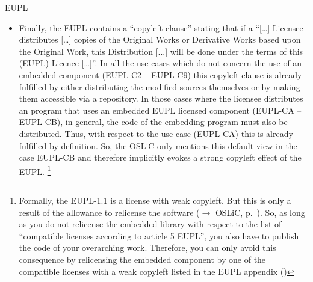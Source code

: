 \begin{license}{EUPL}
\begin{itemize}
\item Finally, the EUPL contains a \enquote{copyleft clause} stating that if a
  \enquote{[\ldots] Licensee distributes [\ldots] copies of the Original Works
  or Derivative Works based upon the Original Work, this Distribution [...] will
  be done under the terms of this (EUPL) Licence [\ldots]}. In all the use cases
  which do not concern the use of an embedded component (EUPL-C2 -- EUPL-C9) this
  copyleft clause is already fulfilled by either distributing the modified
  sources themselves or by making them accessible via a repository. In those
  cases where the licensee distributes an program that uses an embedded EUPL
  licensed component (EUPL-CA -- EUPL-CB), in general, the code of the embedding
  program must also be distributed. Thus, with respect to the use case (EUPL-CA)
  this is already fulfilled by definition. So, the OSLiC only mentions this
  default view in the case EUPL-CB and therefore implicitly evokes a strong
  copyleft effect of the EUPL.%
  \footnote{Formally, the EUPL-1.1 is a license with weak copyleft. But this is
    only a result of the allowance to relicense the software ($\rightarrow$
    OSLiC, p.\ ). So, as long as you do not relicense
    the embedded library with respect to the list of 
    \enquote{compatible licenses according to article 5 EUPL}, you also have to
    publish the code of your overarching work. Therefore, you can only avoid
    this consequence by relicensing the embedded component by one of the
    compatible licenses with a weak copyleft listed in the EUPL appendix
    (\cite[cf.][\nopage wp §5 and Appendix]{EuplLicense2007en})} 

\end{itemize}

\end{license}

%

